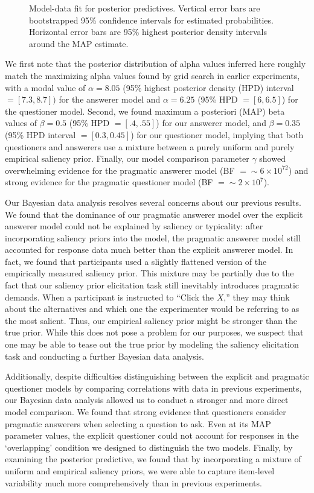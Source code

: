 \documentclass[12pt, floatsintext, jou]{apa6}
\begin{document}
\begin{figure}[t!]
\begin{center}
\end{center}
\caption{Model-data fit for posterior predictives. Vertical error bars are bootstrapped 95\% confidence intervals for estimated probabilities. Horizontal error bars are 95\% highest posterior density intervals around the MAP estimate.}
\label{fig:posteriorPredictives}
\end{figure}

We first note that the posterior distribution of alpha values inferred here roughly match the maximizing alpha values found by grid search in earlier experiments, with a modal value of $\alpha = 8.05$ (95\% highest posterior density (HPD) interval $=[7.3, 8.7])$ for the answerer model and $\alpha = 6.25$ (95\% HPD $=[6, 6.5]$) for the questioner model. Second, we found maximum a posteriori (MAP) beta values of $\beta = 0.5$ (95\% HPD $=[.4, .55]$) for our answerer model, and $\beta = 0.35$ (95\% HPD interval $= [0.3, 0.45]$) for our questioner model, implying that both questioners and answerers use a mixture between a purely uniform and purely empirical saliency prior. Finally, our model comparison parameter $\gamma$ showed overwhelming evidence for the pragmatic answerer model (BF $= \sim6 \times 10^{72}$) and strong evidence for the pragmatic questioner model (BF $= \sim2\times 10^{7}$).

Our Bayesian data analysis resolves several concerns about our previous results. We found that the dominance of our pragmatic answerer model over the explicit answerer model could not be explained by saliency or typicality: after incorporating saliency priors into the model, the pragmatic answerer model still accounted for response data much better than the explicit answerer model. In fact, we found that participants used a slightly flattened version of the empirically measured saliency prior. This mixture may be partially due to the fact that our saliency prior elicitation task still inevitably introduces pragmatic demands. When a participant is instructed to ``Click the $X$,'' they may think about the alternatives and which one the experimenter would be referring to as the most salient. Thus, our empirical saliency prior might be stronger than the true prior. While this does not pose a problem for our purposes, we suspect that one may be able to tease out the true prior by modeling the saliency elicitation task and conducting a further Bayesian data analysis.

Additionally, despite difficulties distinguishing between the explicit and pragmatic questioner models by comparing correlations with data in previous experiments, our Bayesian data analysis allowed us to conduct a stronger and more direct model comparison. We found that strong evidence that questioners consider pragmatic answerers when selecting a question to ask. Even at its MAP parameter values, the explicit questioner could not account for responses in the `overlapping' condition we designed to distinguish the two models. Finally, by examining the posterior predictive, we found that by incorporating a mixture of uniform and empirical saliency priors, we were able to capture item-level variability much more comprehensively than in previous experiments. 
\end{document}
